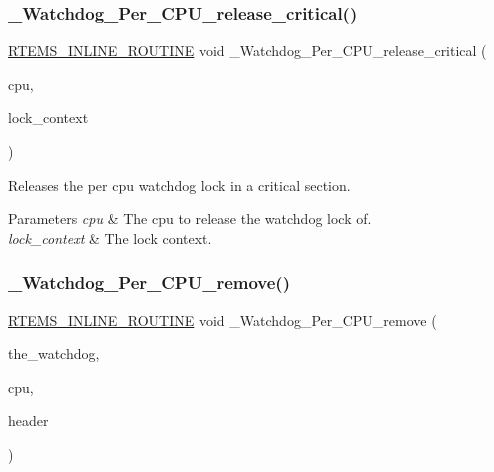 \subsubsection{\texorpdfstring{\_Watchdog\_Per\_CPU\_release\_critical()}{\_Watchdog\_Per\_CPU\_release\_critical()}}
{\footnotesize\ttfamily \mbox{\hyperlink{group__RTEMSScoreBaseDefs_gac216239df231d5dbd15e3520b0b9313f}{R\+T\+E\+M\+S\+\_\+\+I\+N\+L\+I\+N\+E\+\_\+\+R\+O\+U\+T\+I\+NE}} void \+\_\+\+Watchdog\+\_\+\+Per\+\_\+\+C\+P\+U\+\_\+release\+\_\+critical (\begin{DoxyParamCaption}\item[{\mbox{\hyperlink{structPer__CPU__Control}{Per\+\_\+\+C\+P\+U\+\_\+\+Control}} $\ast$}]{cpu,  }\item[{\mbox{\hyperlink{structISR__lock__Context}{I\+S\+R\+\_\+lock\+\_\+\+Context}} $\ast$}]{lock\+\_\+context }\end{DoxyParamCaption})}



Releases the per cpu watchdog lock in a critical section. 


\begin{DoxyParams}{Parameters}
{\em cpu} & The cpu to release the watchdog lock of. \\
\hline
{\em lock\+\_\+context} & The lock context. \\
\hline
\end{DoxyParams}
\mbox{\label{group__RTEMSScoreWatchdog_ga5634267a330e8974e3035399224cf029}} 
\subsubsection{\texorpdfstring{\_Watchdog\_Per\_CPU\_remove()}{\_Watchdog\_Per\_CPU\_remove()}}
{\footnotesize\ttfamily \mbox{\hyperlink{group__RTEMSScoreBaseDefs_gac216239df231d5dbd15e3520b0b9313f}{R\+T\+E\+M\+S\+\_\+\+I\+N\+L\+I\+N\+E\+\_\+\+R\+O\+U\+T\+I\+NE}} void \+\_\+\+Watchdog\+\_\+\+Per\+\_\+\+C\+P\+U\+\_\+remove (\begin{DoxyParamCaption}\item[{\mbox{\hyperlink{structWatchdog__Control}{Watchdog\+\_\+\+Control}} $\ast$}]{the\+\_\+watchdog,  }\item[{\mbox{\hyperlink{structPer__CPU__Control}{Per\+\_\+\+C\+P\+U\+\_\+\+Control}} $\ast$}]{cpu,  }\item[{\mbox{\hyperlink{structWatchdog__Header}{Watchdog\+\_\+\+Header}} $\ast$}]{header }\end{DoxyParamCaption})}




